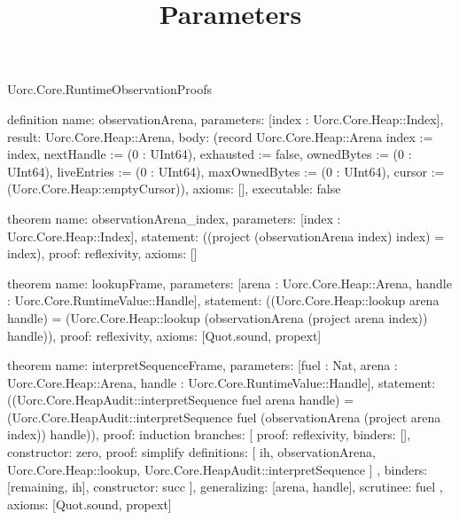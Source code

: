 \begin{lexlean}{Uorc.Core.RuntimeObservationProofs}
\title{Parameters}
\begin{semanticmodule}
definition{
  name: observationArena,
  parameters: [index : Uorc.Core.Heap::Index],
  result: Uorc.Core.Heap::Arena,
  body: (record Uorc.Core.Heap::Arena {index := index, nextHandle := (0 : UInt64), exhausted := false, ownedBytes := (0 : UInt64), liveEntries := (0 : UInt64), maxOwnedBytes := (0 : UInt64), cursor := (Uorc.Core.Heap::emptyCursor)}),
  axioms: [],
  executable: false
}

theorem{
  name: observationArena_index,
  parameters: [index : Uorc.Core.Heap::Index],
  statement: ((project (observationArena index) index) = index),
  proof: reflexivity{},
  axioms: []
}

theorem{
  name: lookupFrame,
  parameters: [arena : Uorc.Core.Heap::Arena, handle : Uorc.Core.RuntimeValue::Handle],
  statement: ((Uorc.Core.Heap::lookup arena handle) = (Uorc.Core.Heap::lookup (observationArena (project arena index)) handle)),
  proof: reflexivity{},
  axioms: [Quot.sound, propext]
}

theorem{
  name: interpretSequenceFrame,
  parameters: [fuel : Nat, arena : Uorc.Core.Heap::Arena, handle : Uorc.Core.RuntimeValue::Handle],
  statement: ((Uorc.Core.HeapAudit::interpretSequence fuel arena handle) = (Uorc.Core.HeapAudit::interpretSequence fuel (observationArena (project arena index)) handle)),
  proof: induction{
    branches: [
      {proof: reflexivity{}, binders: [], constructor: zero},
      {
        proof: simplify{
          definitions: [
            ih,
            observationArena,
            Uorc.Core.Heap::lookup,
            Uorc.Core.HeapAudit::interpretSequence
          ]
        },
        binders: [remaining, ih],
        constructor: succ
      }
    ],
    generalizing: [arena, handle],
    scrutinee: fuel
  },
  axioms: [Quot.sound, propext]
}
\end{semanticmodule}
\end{lexlean}
